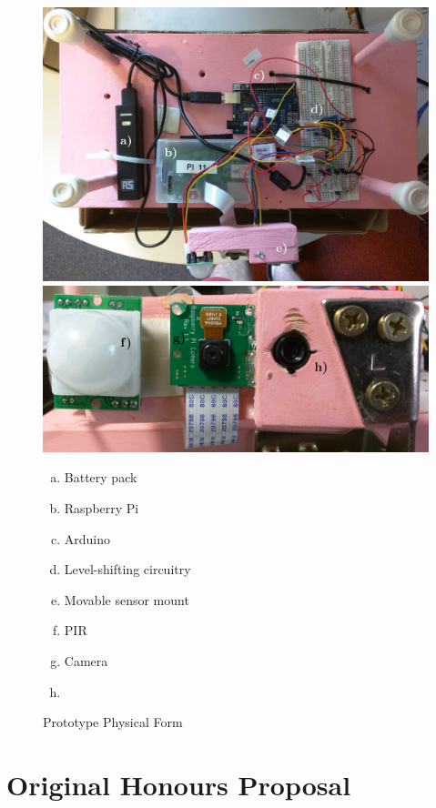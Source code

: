 \begin{figure}[H]
\centering
\includegraphics[width=\textwidth]{../diagrams/prototypeb-1.jpg}
\includegraphics[width=\textwidth]{../diagrams/prototypeb-2.jpg}
{\small
\begin{multicols}{2}
\begin{enumerate}[a)]
 \item Battery pack
 \item Raspberry Pi
 \item Arduino
 \item Level-shifting circuitry
 \item Movable sensor mount
 \item PIR
 \item Camera
 \item \mlx
\end{enumerate}
\end{multicols}
}
\caption{Prototype Physical Form}
\label{fig:pictures:protob1}
\end{figure}

\chapter{Original Honours Proposal}
